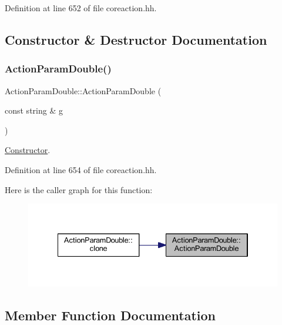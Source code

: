 Definition at line 652 of file coreaction.\+hh.



\subsection{Constructor \& Destructor Documentation}
\mbox{\label{class_action_param_double_ad1003028ad76c95c719279705520f37d}} 
\subsubsection{\texorpdfstring{ActionParamDouble()}{ActionParamDouble()}}
{\footnotesize\ttfamily Action\+Param\+Double\+::\+Action\+Param\+Double (\begin{DoxyParamCaption}\item[{const string \&}]{g }\end{DoxyParamCaption})\hspace{0.3cm}{\ttfamily [inline]}}



\mbox{\hyperlink{class_constructor}{Constructor}}. 



Definition at line 654 of file coreaction.\+hh.

Here is the caller graph for this function\+:
\nopagebreak
\begin{figure}[H]
\begin{center}
\leavevmode
\includegraphics[width=334pt]{class_action_param_double_ad1003028ad76c95c719279705520f37d_icgraph}
\end{center}
\end{figure}


\subsection{Member Function Documentation}
\mbox{\label{class_action_param_double_a8aad0e7534680ca4a79a20c196da103c}} 

